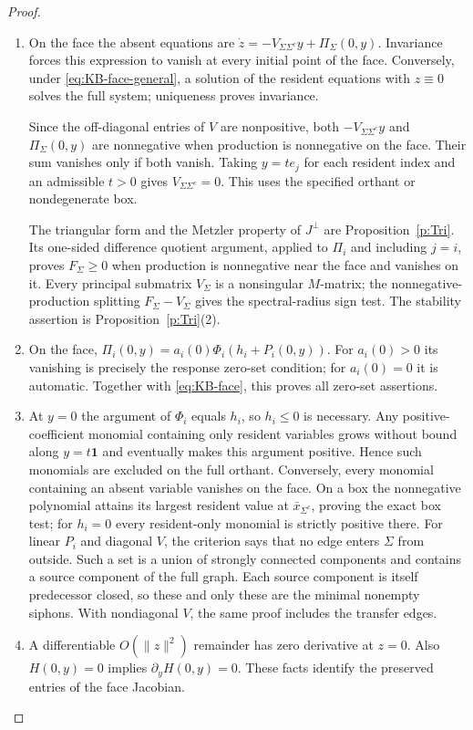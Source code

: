 \begin{proof}
\begin{enumerate}
\item On the face the absent equations are
$\dot z=-V_{\Sigma\Sigma^c}y+\Pi_\Sigma(0,y)$.
Invariance forces this expression to vanish at every initial point
of the face. Conversely, under \eqref{eq:KB-face-general}, a solution
of the resident equations with $z\equiv0$ solves the full system;
uniqueness proves invariance.

Since the off-diagonal entries of $V$ are nonpositive, both
$-V_{\Sigma\Sigma^c}y$ and $\Pi_\Sigma(0,y)$ are nonnegative when production is
nonnegative on the face. Their sum vanishes only if both vanish.
Taking $y=t e_j$ for each resident index and an admissible $t>0$
gives $V_{\Sigma\Sigma^c}=0$. This uses the specified orthant or nondegenerate box.

The triangular form and the Metzler property of $J^\perp$
are Proposition~\ref{p:Tri}. Its one-sided difference quotient
argument, applied to $\Pi_i$ and including $j=i$, proves $F_\Sigma\ge0$ when
production is nonnegative near the face and vanishes on it.
Every principal submatrix $V_\Sigma$ is a nonsingular $M$-matrix;
the nonnegative-production splitting $F_\Sigma-V_\Sigma$ gives the
spectral-radius sign test.
The stability assertion is Proposition~\ref{p:Tri}(2).

\item On the face,
$\Pi_i(0,y)=a_i(0)\Phi_i(h_i+P_i(0,y))$.
For $a_i(0)>0$ its vanishing is precisely the response zero-set
condition; for $a_i(0)=0$ it is automatic. Together with
\eqref{eq:KB-face}, this proves all zero-set assertions.

\item At $y=0$ the argument of $\Phi_i$ equals $h_i$, so $h_i\le0$ is necessary.
Any positive-coefficient monomial containing only resident
variables grows without bound along $y=t\mathbf1$ and eventually
makes this argument positive. Hence such monomials are excluded on
the full orthant. Conversely, every monomial containing an absent
variable vanishes on the face.
On a box the nonnegative polynomial attains its largest resident
value at $\bar x_{\Sigma^c}$, proving the exact box test; for $h_i=0$ every
resident-only monomial is strictly positive there.
For linear $P_i$ and diagonal $V$, the criterion says that no
edge enters $\Sigma$ from outside. Such a set is a union of strongly
connected components and contains a source component of the full
graph. Each source component is itself predecessor closed, so
these and only these are the minimal nonempty siphons.
With nondiagonal $V$, the same proof includes the transfer edges.

\item A differentiable $O(\|z\|^2)$ remainder has zero derivative
at $z=0$. Also $H(0,y)=0$ implies $\partial_yH(0,y)=0$.
These facts identify the preserved entries of the face Jacobian.
\end{enumerate}
\end{proof}

